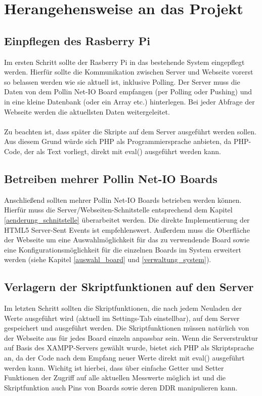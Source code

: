 \section{Herangehensweise an das Projekt}
\subsection{Einpflegen des Rasberry Pi}
Im ersten Schritt sollte der Rasberry Pi in das bestehende System eingepflegt
werden. Hierfür sollte die Kommunikation zwischen Server und Webseite vorerst so
belassen werden wie sie aktuell ist, inklusive Polling. Der Server muss die
Daten von dem Pollin Net-IO Board empfangen (per Polling oder Pushing) und in
eine kleine Datenbank (oder ein Array etc.) hinterlegen. Bei jeder Abfrage der
Webseite werden die aktuellsten Daten weitergeleitet.\\
\\
Zu beachten ist, dass später die Skripte auf dem Server ausgeführt werden sollen.
Aus diesem Grund würde sich PHP als Programmiersprache anbieten, da PHP-Code,
der als Text vorliegt, direkt mit \textrm{eval()} ausgeführt werden kann.

\subsection{Betreiben mehrer Pollin Net-IO Boards}
Anschließend sollten mehrer Pollin Net-IO Boards betrieben werden können.
Hierfür muss die Server/Webseiten-Schnitstelle entsprechend dem Kapitel
\ref{aenderung_schnitstelle} überarbeitet werden. Die direkte Implementierung
der HTML5 Server-Sent Events ist empfehlenswert. Außerdem muss die Oberfläche
der Webseite um eine Auswahlmöglichkeit für das zu verwendende Board sowie eine
Konfigurationsmöglichkeit für die einzelnen Boards im System erweitert werden
(siehe Kapitel \ref{auswahl_board} und \ref{verwaltung_system}).

\subsection{Verlagern der Skriptfunktionen auf den Server}
Im letzten Schritt sollten die Skriptfunktionen, die nach jedem Neuladen der
Werte ausgeführt wird (aktuell im Settings-Tab einstellbar), auf dem Server
gespeichert und ausgeführt werden. Die Skriptfunktionen müssen natürlich von der
Webseite aus für jedes Board einzeln anpassbar sein. 
Wenn die Serverstruktur auf Basis des
XAMPP-Servers gewählt wurde, bietet sich PHP als Skriptsprache an, da der Code
nach dem Empfang neuer Werte direkt mit \textrm{eval()} ausgeführt werden kann.
Wichitg ist hierbei, dass über einfache Getter und Setter Funktionen der Zugriff
auf alle aktuellen Messwerte möglich ist und die Skriptfunktion auch Pins von
Boards sowie deren DDR manipulieren kann.
